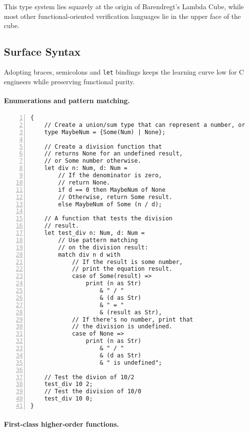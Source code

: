 \documentclass[conference]{IEEEtran}
\begin{document}
This type system lies squarely at the origin of Barendregt's Lambda Cube, while most other functional-oriented verification languages lie in the upper face of the cube\cite{barendregt1991}.

\subsection{Surface Syntax}
Adopting braces, semicolons and \texttt{let} bindings keeps the learning curve low for C engineers while preserving functional purity.

\paragraph{Enumerations and pattern matching.}
\begin{lstlisting}[language=Verus, caption={Safe integer division with algebraic data types.}, numbers=left]
{
    // Create a union/sum type that can represent a number, or void.
    type MaybeNum = {Some(Num) | None};

    // Create a division function that
    // returns None for an undefined result,
    // or Some number otherwise.
    let div n: Num, d: Num =
        // If the denominator is zero,
        // return None.
        if d == 0 then MaybeNum of None
        // Otherwise, return Some result.
        else MaybeNum of Some (n / d);

    // A function that tests the division
    // result.
    let test_div n: Num, d: Num =
        // Use pattern matching
        // on the division result:
        match div n d with
            // If the result is some number,
            // print the equation result.
            case of Some(result) =>
                print (n as Str)
                    & " / "
                    & (d as Str)
                    & " = "
                    & (result as Str),
            // If there's no number, print that
            // the division is undefined.
            case of None =>
                print (n as Str)
                    & " / "
                    & (d as Str)
                    & " is undefined";

    // Test the divion of 10/2
    test_div 10 2;
    // Test the division of 10/0
    test_div 10 0;
}
\end{lstlisting}

\paragraph{First‑class higher‑order functions.}
\end{document}
